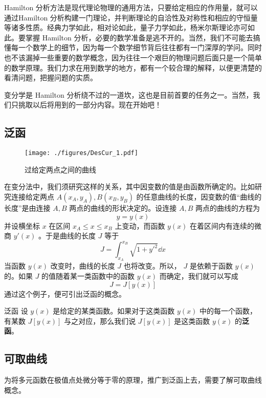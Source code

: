 
Hamilton 分析方法是现代理论物理的通用方法，只要给定相应的作用量，就可以通过Hamilton 分析构建一门理论，并判断理论的自洽性及对称性和相应的守恒量等诸多性质。经典力学如此，相对论如此，量子力学如此，杨米尔斯理论亦可如此。要掌握 Hamilton 分析，必要的数学准备是逃不开的。当然，我们不可能去搞懂每一个数学上的细节，因为每一个数学细节背后往往都有一门深厚的学问。同时也不该漏掉一些重要的数学概念，因为往往一个艰巨的物理问题后面只是一个简单的数学原理。我们力求在用到数学的地方，都有一个较合理的解释，以便更清楚的看清问题，把握问题的实质。

变分学是 Hamilton 分析绕不过的一道坎，这也是目前首要的任务之一。当然，我们只挑取以后将用到的一部分内容。现在开始吧！
\subsection{泛函}
\begin{figure}[ht]
\centering
\texttt{[image: ./figures/DesCur\_1.pdf]}
\caption{过给定两点之间的曲线} \label{DesCur_fig1}
\end{figure}
在变分法中，我们须研究这样的关系，其中因变数的值是由函数所确定的。比如研究连接给定两点 $A(x_A,y_A),B(x_B,y_B)$ 的任意曲线的长度，因变数的值“曲线的长度”是由连接 $A,B$ 两点的曲线的形状决定的。设连接 $A,B$ 两点的曲线的方程为
\begin{equation}
y=y(x)
\end{equation}
并设横坐标 $x$ 在区间 $x_A\leq x\leq x_B$ 上变动，而函数 $y(x)$ 在着区间内有连续的微商 $y'(x)$ 。于是曲线的长度 $J$ 等于
\begin{equation}
J=\int_{x_A}^{x_B} \sqrt{1+y'^2}\dd x
\end{equation}
当函数 $y(x)$ 改变时，曲线的长度 $J$ 也将改变。所以， $J$ 是依赖于函数 $y(x)$ 的。如果 $J$ 的值随着某一类函数中的函数 $y(x)$ 而确定，我们就可以写成
\begin{equation}
J=J[y(x)]
\end{equation}
通过这个例子，便可引出泛函的概念。
\begin{definition}{泛函}
设 $y(x)$ 是给定的某类函数。如果对于这类函数 $y(x)$ 中的每一个函数，有某数 $J[y(x)]$ 与之对应，那么我们说 $J[y(x)]$ 是这类函数 $y(x)$ 的\textbf{泛函}。
\end{definition}
\subsection{可取曲线}\label{DesCur_sub1}
为将多元函数在极值点处微分等于零的原理，推广到泛函上去，需要了解可取曲线概念。


